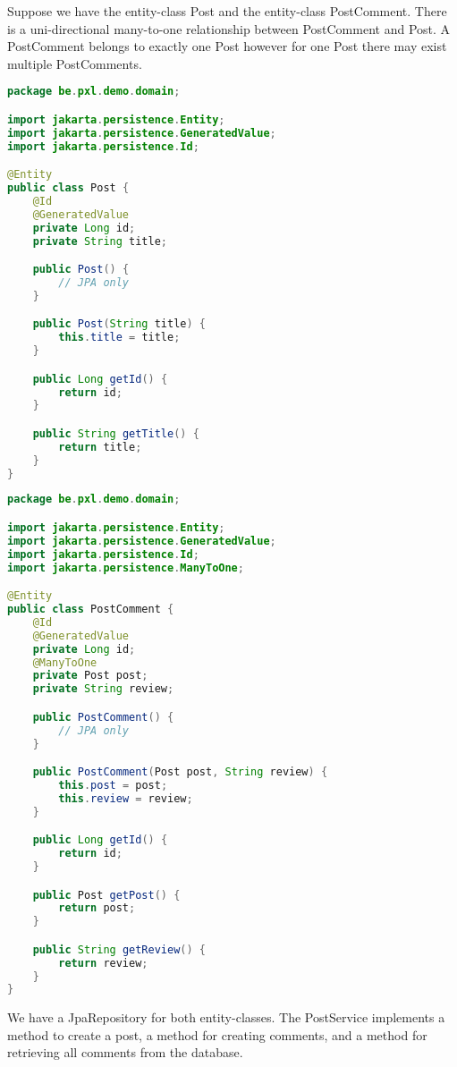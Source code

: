Suppose we have the entity-class Post and the entity-class PostComment. There is a uni-directional many-to-one relationship between PostComment and Post.  A PostComment belongs to exactly one Post however for one Post there may exist multiple PostComments.

\begin{lstlisting}[frame=single,  language=java]
package be.pxl.demo.domain;

import jakarta.persistence.Entity;
import jakarta.persistence.GeneratedValue;
import jakarta.persistence.Id;

@Entity
public class Post {
	@Id
	@GeneratedValue
	private Long id;
	private String title;

	public Post() {
		// JPA only
	}

	public Post(String title) {
		this.title = title;
	}

	public Long getId() {
		return id;
	}

	public String getTitle() {
		return title;
	}
}
\end{lstlisting}

\begin{lstlisting}[frame=single,  language=java]
package be.pxl.demo.domain;

import jakarta.persistence.Entity;
import jakarta.persistence.GeneratedValue;
import jakarta.persistence.Id;
import jakarta.persistence.ManyToOne;

@Entity
public class PostComment {
	@Id
	@GeneratedValue
	private Long id;
	@ManyToOne
	private Post post;
	private String review;

	public PostComment() {
		// JPA only
	}

	public PostComment(Post post, String review) {
		this.post = post;
		this.review = review;
	}

	public Long getId() {
		return id;
	}

	public Post getPost() {
		return post;
	}

	public String getReview() {
		return review;
	}
}
\end{lstlisting}

We have a JpaRepository for both entity-classes.
The PostService implements a method to create a post, a method for creating comments, and a method for retrieving all comments from the database.

